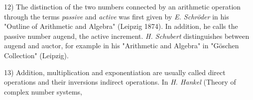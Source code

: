 \vfill
\leftline{\rule{2in}{0.4pt}}
\vspace{0.2cm}
{
\footnotesize
12) The distinction of the two numbers connected by an arithmetic operation through the terms \textit{passive} and \textit{active} was first given by \textit{E. Schröder} in his "Outline of Arithmetic and Algebra" (Leipzig 1874). In addition, he calls the passive number augend, the active increment. \textit{H. Schubert} distinguishes between augend and auctor, for example in his "Arithmetic and Algebra" in "Göschen Collection" (Leipzig).

13) Addition, multiplication and exponentiation are usually called direct operations and their inversions indirect operations. In \textit{H. Hankel} (Theory of complex number systems, 

}

